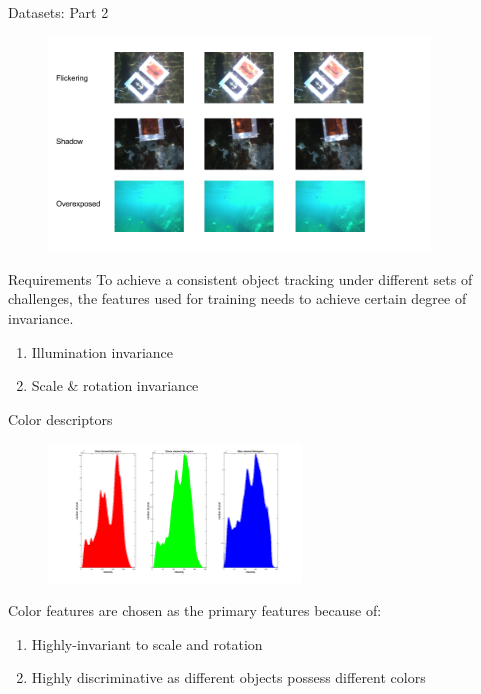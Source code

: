 \documentclass[14pt]{beamer}
\begin{document}
\begin{frame}{Datasets: Part 2}
  \begin{figure}[ht]
      \centering
      \includegraphics[width=0.9\textwidth, height=0.6\textwidth]{figs/data2.png}
  \end{figure}
\end{frame}

\begin{frame}{Requirements}
  To achieve a consistent object tracking under different sets of challenges,
  the features used for training needs to achieve certain degree of invariance.
  \begin{enumerate}
    \item Illumination invariance
    \item Scale \& rotation invariance
  \end{enumerate}
\end{frame}

\begin{frame}{Color descriptors}

  \begin{figure}[ht]
      \centering
      \includegraphics[width=0.6\textwidth, height=0.3\textwidth]{figs/colorhistogram.png}
  \end{figure}

  Color features are chosen as the primary features because of:
  \begin{enumerate}
    \item Highly-invariant to scale and rotation
    \item Highly discriminative as different objects possess different colors
  \end{enumerate}

\end{frame}
\end{document}
